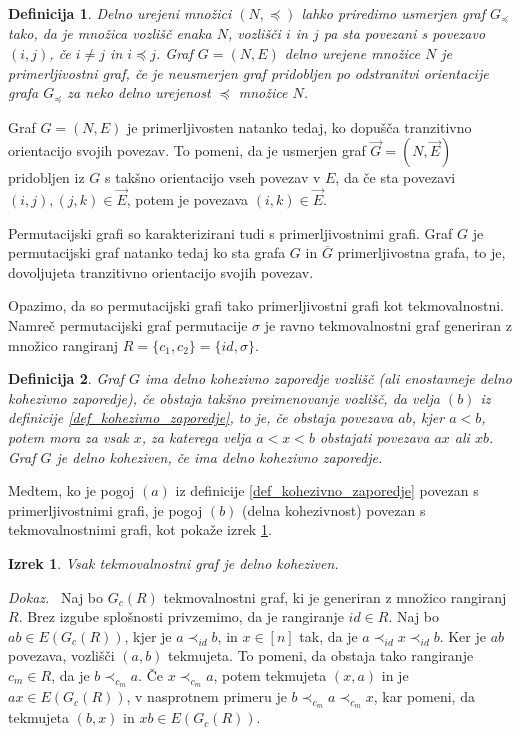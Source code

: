 \documentclass[a4paper, 12pt]{book}
\newtheorem{definicija}{Definicija}[chapter]
\newtheorem{izrek}{Izrek}[chapter]
\newenvironment{dokaz}{\emph{Dokaz.}\ }{\hspace{\fill}{$\Box$}}
\begin{document}
\begin{definicija}
    Delno urejeni množici $(N, \preceq)$ lahko priredimo usmerjen graf $G_{\preceq}$ tako, da je množica vozlišč enaka $N$, vozlišči $i$ in $j$ pa sta povezani s povezavo $(i, j)$, če $i \neq j$ in $i \preceq j$.
    Graf $G = (N, E)$ delno urejene množice $N$ je primerljivostni graf, če je neusmerjen graf pridobljen po odstranitvi orientacije grafa $G_{\preceq}$ za neko delno urejenost $\preceq$  množice $N$.
\end{definicija}
Graf $G = (N, E)$ je primerljivosten natanko tedaj, ko dopušča tranzitivno orientacijo svojih povezav. To pomeni, da je usmerjen graf $\overset{\rightarrow}{G} = (N, \overset{\rightarrow}{E})$ pridobljen iz $G$ s takšno orientacijo vseh povezav v $E$, da če sta povezavi $(i, j), (j, k) \in \overset{\rightarrow}{E}$, potem je povezava $(i, k) \in \overset{\rightarrow}{E}$.

Permutacijski grafi so karakterizirani tudi s primerljivostnimi grafi. Graf $G$ je permutacijski graf natanko tedaj ko sta grafa $G$ in $\overline{G}$ primerljivostna grafa, to je, dovoljujeta tranzitivno orientacijo svojih povezav.

Opazimo, da so permutacijski grafi tako primerljivostni grafi kot tekmovalnostni. Namreč permutacijski graf permutacije $\sigma$ je ravno tekmovalnostni graf generiran z množico rangiranj $R = \{ c_1, c_2 \} = \{ id, \sigma\}$.

\begin{definicija}
    Graf $G$ ima delno kohezivno zaporedje vozlišč (ali enostavneje delno kohezivno zaporedje), če obstaja takšno preimenovanje vozlišč, da velja $(b)$ iz definicije \ref{def_kohezivno_zaporedje}, to je, če obstaja povezava $ab$, kjer $a < b$, potem mora za vsak $x$, za katerega velja $a < x < b$ obstajati povezava $ax$ ali $xb$. Graf $G$ je delno koheziven, če ima delno kohezivno zaporedje.
\end{definicija}

Medtem, ko je pogoj $(a)$ iz definicije \ref{def_kohezivno_zaporedje} povezan s primerljivostnimi grafi, je pogoj $(b)$ (delna kohezivnost) povezan s tekmovalnostnimi grafi, kot pokaže izrek \ref{tekmovalnosni_graf_delno_koheziven}.

\begin{izrek}
\label{tekmovalnosni_graf_delno_koheziven}
    Vsak tekmovalnostni graf je delno koheziven.
\end{izrek}
\begin{dokaz}
    Naj bo $G_c(R)$ tekmovalnostni graf, ki je generiran z množico rangiranj $R$. Brez izgube splošnosti privzemimo, da je rangiranje $id \in R$. Naj bo $ab \in E(G_c(R))$, kjer je $a \prec_{id} b$, in $x \in [n]$ tak, da je $a \prec_{id} x \prec_{id} b$. Ker je $ab$ povezava, vozlišči $(a, b)$ tekmujeta. To pomeni, da obstaja tako rangiranje $c_m \in R$, da je $b \prec_{c_m} a$. Če $x \prec_{c_m} a$, potem tekmujeta $(x, a)$ in je $ax \in E(G_c(R))$, v nasprotnem primeru je $b \prec_{c_m} a \prec_{c_m} x$, kar pomeni, da tekmujeta $(b, x)$ in $xb \in E(G_c(R))$.
\end{dokaz}
\end{document}
